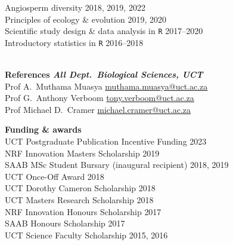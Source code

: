\documentclass[10pt]{article}
\begin{document}
\begin{multicols}{2}
Angiosperm diversity                         \hfill {\small 2018, 2019, 2022} \\
Principles of ecology \& evolution           \hfill {\small       2019, 2020} \\
Scientific study design \& data analysis in
  \texttt{R}                                 \hfill {\small       2017--2020} \\
Introductory statistics in \texttt{R}        \hfill {\small       2016--2018} \\

\

\textbf{References %
        \hfill {\small \textmd{\textit{All Dept.~Biological Sciences, UCT}}}} \\

Prof A.~Muthama Muasya
      \hfill \href{mailto:muthama.muasya@uct.ac.za}{muthama.muasya@uct.ac.za} \\
Prof G.~Anthony Verboom
      \hfill     \href{mailto:tony.verboom@uct.ac.za}{tony.verboom@uct.ac.za} \\
Prof Michael D.~Cramer
      \hfill \href{mailto:michael.cramer@uct.ac.za}{michael.cramer@uct.ac.za} \\

\columnbreak

\textbf{Funding \& awards} \\ %

UCT Postgraduate Publication Incentive Funding     \hfill {\small       2023} \\
NRF Innovation Masters Scholarship                 \hfill {\small       2019} \\
SAAB MSc Student Bursary
  {\small (inaugural recipient)}                   \hfill {\small 2018, 2019} \\
UCT Once-Off Award                                 \hfill {\small       2018} \\
UCT Dorothy Cameron Scholarship                    \hfill {\small       2018} \\
UCT Masters Research Scholarship                   \hfill {\small       2018} \\
NRF Innovation Honours Scholarship                 \hfill {\small       2017} \\
SAAB Honours Scholarship                           \hfill {\small       2017} \\
UCT Science Faculty Scholarship                    \hfill {\small 2015, 2016} \\


\end{multicols}
\end{document}
